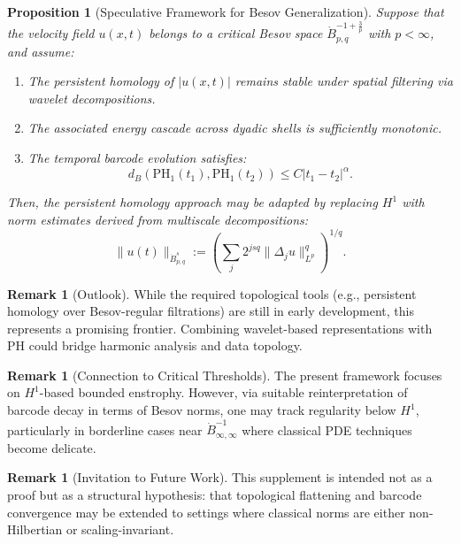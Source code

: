 \documentclass[11pt]{article}
\newtheorem{proposition}[theorem]{Proposition}
\theoremstyle{definition}
\newtheorem{remark}[theorem]{Remark}
\begin{document}
\begin{proposition}[Speculative Framework for Besov Generalization]
Suppose that the velocity field $u(x,t)$ belongs to a critical Besov space $\dot{B}^{-1+\frac{3}{p}}_{p,q}$ with $p < \infty$, and assume:
\begin{enumerate}
    \item The persistent homology of $|u(x,t)|$ remains stable under spatial filtering via wavelet decompositions.
    \item The associated energy cascade across dyadic shells is sufficiently monotonic.
    \item The temporal barcode evolution satisfies:
    \[
    d_B(\mathrm{PH}_1(t_1), \mathrm{PH}_1(t_2)) \leq C|t_1 - t_2|^\alpha.
    \]
\end{enumerate}
Then, the persistent homology approach may be adapted by replacing $H^1$ with norm estimates derived from multiscale decompositions:
\[
\|u(t)\|_{\dot{B}^{s}_{p,q}} := \left( \sum_j 2^{jsq} \| \Delta_j u \|_{L^p}^q \right)^{1/q}.
\]
\end{proposition}

\begin{remark}[Outlook]
While the required topological tools (e.g., persistent homology over Besov-regular filtrations) are still in early development, this represents a promising frontier. Combining wavelet-based representations with PH could bridge harmonic analysis and data topology.
\end{remark}

\begin{remark}[Connection to Critical Thresholds]
The present framework focuses on $H^1$-based bounded enstrophy. However, via suitable reinterpretation of barcode decay in terms of Besov norms, one may track regularity below $H^1$, particularly in borderline cases near $\dot{B}^{-1}_{\infty,\infty}$ where classical PDE techniques become delicate.
\end{remark}

\begin{remark}[Invitation to Future Work]
This supplement is intended not as a proof but as a structural hypothesis: that topological flattening and barcode convergence may be extended to settings where classical norms are either non-Hilbertian or scaling-invariant.
\end{remark}
\end{document}
